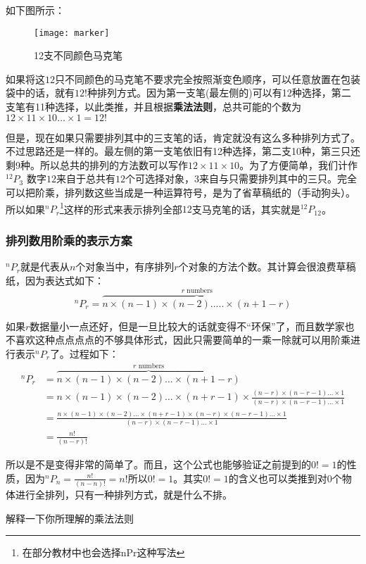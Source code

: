 如下图所示：
\begin{figure}[H]
\centering
\texttt{[image: marker]}
\label{fig:marker}
\caption{12支不同颜色马克笔}
\end{figure}
如果将这$12$只不同颜色的马克笔不要求完全按照渐变色顺序，可以任意放置在包装袋中的话，就有$12!$种排列方式。因为第一支笔(最左侧的)可以有12种选择，第二支笔有11种选择，以此类推，并且根据\textbf{乘法法则}，总共可能的个数为$12\times 11\times 10 \ldots \times 1 =12!$

但是，现在如果只需要排列其中的三支笔的话，肯定就没有这么多种排列方式了。不过思路还是一样的。最左侧的第一支笔依旧有12种选择，第二支10种，第三只还剩9种。所以总共的排列的方法数可以写作$12\times 11 \times 10$。为了方便简单，我们计作$^{12}P_3$ 数字$12$来自于总共有$12$个可选择对象，$3$来自与只需要排列其中的三只。完全可以把阶乘，排列数这些当成是一种运算符号，是为了省草稿纸的（手动狗头）。所以如果$^{n}P_{r}$\footnote{在部分教材中也会选择nPr这种写法}这样的形式来表示排列全部$12$支马克笔的话，其实就是$^{12}P_{12}$。

\subsubsection*{排列数用阶乘的表示方案}
$^{n}P_{r}$就是代表从$n$个对象当中，有序排列$r$个对象的方法个数。其计算会很浪费草稿纸，因为表达式如下：
\[
	^nP_r= \overbrace{n\times(n-1)\times (n-2).....\times(n+1-r)}^{r\text{ numbers}}
\]

如果$r$数据量小一点还好，但是一旦比较大的话就变得不``环保''了，而且数学家也不喜欢这种点点点点的不够具体形式，因此只需要简单的一乘一除就可以用阶乘进行表示$^nP_r$了。过程如下：
\begin{align*}
	^nP_r &= \overbrace{n\times(n-1)\times (n-2)\ldots\times(n+1-r)}^{r\text{ numbers}}\\
		  &= n\times(n-1)\times (n-2)\ldots \times(n+r-1) \times \frac{(n-r)\times (n-r-1) \ldots\times 1}{(n-r)\times (n-r-1) \ldots\times 1}\\
		  &= \frac{n\times(n-1)\times (n-2)\ldots \times(n+r-1)\times(n-r)\times (n-r-1) \ldots\times 1 }{(n-r)\times (n-r-1) \ldots\times 1}\\
		  &= \frac{n!}{(n-r)!}
\end{align*}

所以是不是变得非常的简单了。而且，这个公式也能够验证之前提到的$0!=1$的性质，因为$^nP_n=\frac{n!}{(n-n)!}=n!$所以$0!=1$。其实$0!=1$的含义也可以类推到对0个物体进行全排列，只有一种排列方式，就是什么不排。

\begin{TaskBox}
解释一下你所理解的乘法法则
\end{TaskBox}
\clearpage

